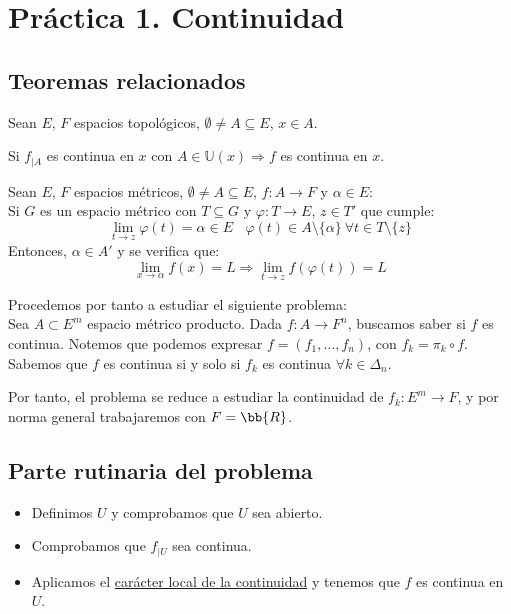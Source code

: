 \chapter{Práctica 1. Continuidad}
\label{practica1}

\section{Teoremas relacionados}
\begin{teo}
    Sean $E$, $F$ espacios topológicos, $\emptyset \neq A \subseteq E$, $x \in A$.

    
    Si $f_{\big| A}$ es continua en $x$ con $A \in \mathbb{U}(x) \Rightarrow f$ es continua en $x$.
\end{teo}

\begin{teo}
    Sean $E$, $F$ espacios métricos, $\emptyset \neq A \subseteq E$, $f:A \rightarrow F$
    y $\alpha \in E$:\\

    
    Si $G$ es un espacio métrico con $T \subseteq G$ y $\varphi:T \rightarrow E$, $z \in T'$ que cumple:
    $$\lim_{t \to z}\varphi(t)=\alpha \in E ~~~~ \varphi(t) \in A\setminus\{\alpha\} ~\forall t \in T\setminus\{z\}$$
    Entonces, $\alpha \in A'$ y se verifica que:
    $$\lim_{x \to \alpha} f(x) = L \Rightarrow \lim_{t \to z}f(\varphi(t)) = L$$
\end{teo}

\vspace{2cm}

Procedemos por tanto a estudiar el siguiente problema:\\

\noindent
Sea $A\subset E^m$ espacio métrico producto. Dada $f:A \rightarrow F^n$, buscamos saber si $f$ es continua. Notemos que podemos expresar $f=(f_1,\dots,f_n)$, con $f_k=\pi_k\circ f$. Sabemos que $f$ es continua si y solo si $f_k$ es continua $\forall k\in \Delta_n$.

Por tanto, el problema se reduce a estudiar la continuidad de $f_k:E^m\to F$, y por norma general trabajaremos con $F=\bb{R}$.

\section{Parte rutinaria del problema}
\begin{itemize}
    \item Definimos $U$ y comprobamos que $U$ sea abierto.
    \item Comprobamos que $f_{\big|U}$ sea continua.
    \item Aplicamos el \underline{carácter local de la continuidad} y tenemos que $f$ es continua en $U$.
\end{itemize}



